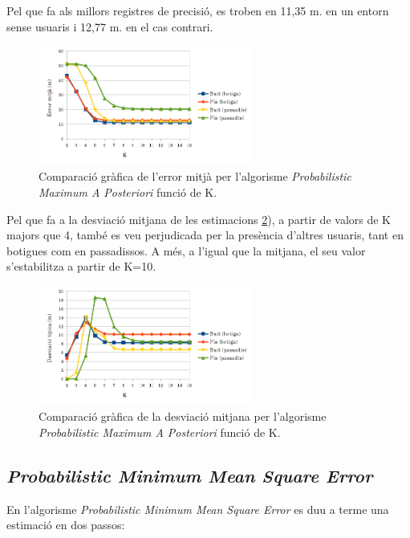 Pel que fa als millors registres de precisió, es troben en 11,35 m. en un entorn sense usuaris i 12,77 m. en el cas contrari.

\begin{figure}[ht]
\begin{center}
\includegraphics[width=7cm]{imatges/map_mitja.png}
\caption{Comparació gràfica de l'error mitjà per l'algorisme \textit{Probabilistic Maximum A Posteriori} funció de K.}
\label{fig:grafic_mitja_MAP}
\end{center}
\end{figure}

Pel que fa a la desviació mitjana de les estimacions \ref{fig:grafic_desviacio_MAP}), a partir de valors de K majors que 4, també es veu perjudicada per la presència d'altres usuaris, tant en botigues com en passadissos. A més, a l'igual que la mitjana, el seu valor s'estabilitza a partir de K=10.

\begin{figure}[ht]
\begin{center}
\includegraphics[width=7cm]{imatges/map_desviacio.png}
\caption{Comparació gràfica de la desviació mitjana per l'algorisme \textit{Probabilistic Maximum A Posteriori} funció de K.}
\label{fig:grafic_desviacio_MAP}
\end{center}
\end{figure}

\subsection{\textit{Probabilistic Minimum Mean Square Error}}

En l'algorisme \textit{Probabilistic Minimum Mean Square Error} es duu a terme una estimació en dos passos:

